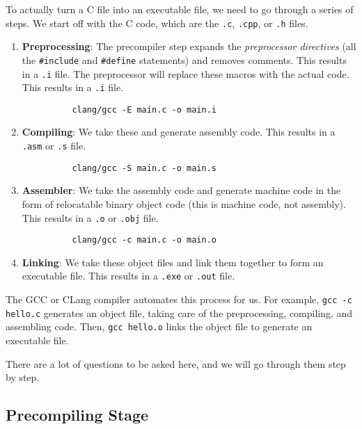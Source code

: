   \begin{definition}
    To actually turn a C file into an executable file, we need to go through a series of steps. We start off with the C code, which are the \texttt{.c}, \texttt{.cpp}, or \texttt{.h} files. 
    \begin{enumerate}
      \item \textbf{Preprocessing}: The precompiler step expands the \textit{preprocessor directives} (all the \texttt{\#include} and \texttt{\#define} statements) and removes comments. This results in a \texttt{.i} file. The preprocessor will replace these macros with the actual code. This results in a \texttt{.i} file.
        \begin{lstlisting}
          clang/gcc -E main.c -o main.i
        \end{lstlisting}

      \item \textbf{Compiling}: We take these and generate assembly code. This results in a \texttt{.asm} or \texttt{.s} file.
        \begin{lstlisting}
          clang/gcc -S main.c -o main.s
        \end{lstlisting}

      \item \textbf{Assembler}: We take the assembly code and generate machine code in the form of relocatable binary object code (this is machine code, not assembly). This results in a \texttt{.o} or \texttt{.obj} file.
        \begin{lstlisting}
          clang/gcc -c main.c -o main.o
        \end{lstlisting}

      \item \textbf{Linking}: We take these object files and link them together to form an executable file. This results in a \texttt{.exe} or \texttt{.out} file.
    \end{enumerate}
    The GCC or CLang compiler automates this process for us. For example, \texttt{gcc -c hello.c} generates an object file, taking care of the preprocessing, compiling, and assembling code. Then, \texttt{gcc hello.o} links the object file to generate an executable file. 
  \end{definition}

  There are a lot of questions to be asked here, and we will go through them step by step. 

  \subsection{Precompiling Stage} 

